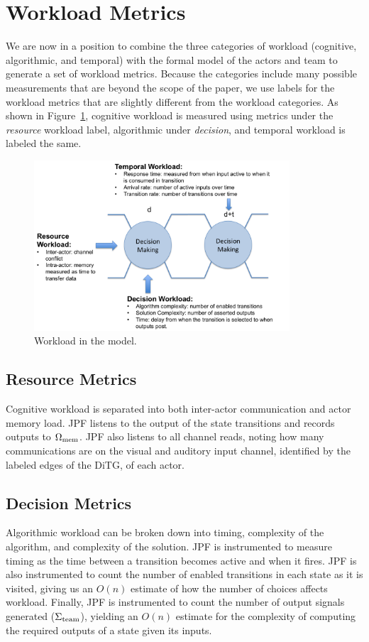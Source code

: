 \section{Workload Metrics}
We are now in a position to combine the three categories of workload (cognitive, algorithmic, and temporal) with the formal model of the actors and team to generate a set of workload metrics.  Because the categories include many possible measurements that are beyond the scope of the paper, we use labels for the workload metrics that are slightly different from the workload categories.  As shown in Figure~\ref{fig:WorkloadMetrics}, cognitive workload is measured using metrics under the {\em resource} workload label, algorithmic under {\em decision}, and temporal workload is labeled the same. 


\begin{figure}[h]
\center
\setlength{\abovecaptionskip}{1mm}
\setlength{\belowcaptionskip}{1mm}
\setlength{\textfloatsep}{1mm}
\setlength{\floatsep}{1mm}
\includegraphics[height=2.5in]{WorkloadMetrics.png}
\caption{Workload in the model.}
\label{fig:WorkloadMetrics}
\end{figure}

\subsection{Resource Metrics}
Cognitive workload is separated into both inter-actor communication and actor memory load. JPF listens to the output of the state transitions and records outputs to $\Omega_{\rm mem}$.  JPF also listens to all channel reads, noting how many communications are on the visual and auditory input channel, identified by the labeled edges of the DiTG, of each actor. 


\subsection{Decision Metrics}
Algorithmic workload can be broken down into timing, complexity of the algorithm, and complexity of the solution. JPF is instrumented to measure timing as the time between a transition becomes active and when it fires.  JPF is also instrumented to count the number of enabled transitions in each state as it is visited, giving us an $O(n)$ estimate of how the number of choices affects workload.   Finally, JPF is instrumented to count the number of output signals generated ($\Sigma_{\rm team}$), yielding an $O(n)$ estimate for the complexity of computing the required outputs of a state given its inputs.

